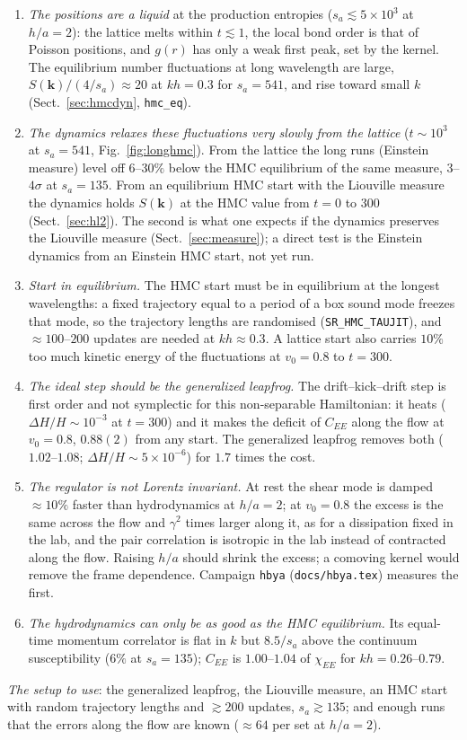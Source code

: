 \documentclass[11pt,aps,preprint,nofootinbib,superscriptaddress,tightenlines]{revtex4-2}
\def\Sect#1{Sect.~\ref{#1}}
\def\Fig#1{Fig.~\ref{#1}}
\begin{document}
\begin{enumerate}
\item \emph{The positions are a liquid} at the production entropies ($s_a\lesssim5\times10^3$ at $h/a=2$): the lattice melts within $t\lesssim1$, the local bond
  order is that of Poisson positions, and $g(r)$ has only a weak first peak, set by the kernel.  The equilibrium number fluctuations at long
  wavelength are large, $S(\bm k)/(4/s_a)\approx20$ at $kh=0.3$ for $s_a=541$, and rise toward small $k$ (\Sect{sec:hmcdyn}, \texttt{hmc\_eq}).
\item \emph{The dynamics relaxes these fluctuations very slowly from the lattice} ($t\sim10^3$ at $s_a=541$, \Fig{fig:longhmc}).  From the lattice the
  long runs (Einstein measure) level off $6$--$30\%$ below the HMC equilibrium of the same measure, $3$--$4\sigma$ at $s_a=135$.  From an equilibrium HMC
  start with the Liouville measure the dynamics holds $S(\bm k)$ at the HMC value from $t=0$ to $300$ (\Sect{sec:hl2}).  The second is what one
  expects if the dynamics preserves the Liouville measure (\Sect{sec:measure}); a direct test is the Einstein dynamics from an Einstein HMC
  start, not yet run.
\item \emph{Start in equilibrium.}  The HMC start must be in equilibrium at the longest wavelengths: a fixed trajectory equal to a period of a box
  sound mode freezes that mode, so the trajectory lengths are randomised (\texttt{SR\_HMC\_TAUJIT}), and $\approx100$--$200$ updates are needed at
  $kh\approx0.3$.  A lattice start also carries $10\%$ too much kinetic energy of the fluctuations at $v_0=0.8$ to $t=300$.
\item \emph{The ideal step should be the generalized leapfrog.}  The drift--kick--drift step is first order and not symplectic for this
  non-separable Hamiltonian: it heats ($\Delta H/H\sim10^{-3}$ at $t=300$) and it makes the deficit of $C_{EE}$ along the flow at $v_0=0.8$, $0.88(2)$
  from any start.  The generalized leapfrog removes both ($1.02$--$1.08$; $\Delta H/H\sim5\times10^{-6}$) for $1.7$ times the cost.
\item \emph{The regulator is not Lorentz invariant.}  At rest the shear mode is damped $\approx10\%$ faster than hydrodynamics at $h/a=2$; at $v_0=0.8$ the
  excess is the same across the flow and $\gamma^2$ times larger along it, as for a dissipation fixed in the lab, and the pair correlation is
  isotropic in the lab instead of contracted along the flow.  Raising $h/a$ should shrink the excess; a comoving kernel would remove the
  frame dependence.  Campaign \texttt{hbya} (\texttt{docs/hbya.tex}) measures the first.
\item \emph{The hydrodynamics can only be as good as the HMC equilibrium.}  Its equal-time momentum correlator is flat in $k$ but $8.5/s_a$
  above the continuum susceptibility ($6\%$ at $s_a=135$); $C_{EE}$ is $1.00$--$1.04$ of $\chi_{EE}$ for $kh=0.26$--$0.79$.
\end{enumerate}
\emph{The setup to use}: the generalized leapfrog, the Liouville measure, an HMC start with random trajectory lengths and $\gtrsim200$ updates,
$s_a\gtrsim135$; and enough runs that the errors along the flow are known ($\approx64$ per set at $h/a=2$).
\end{document}
